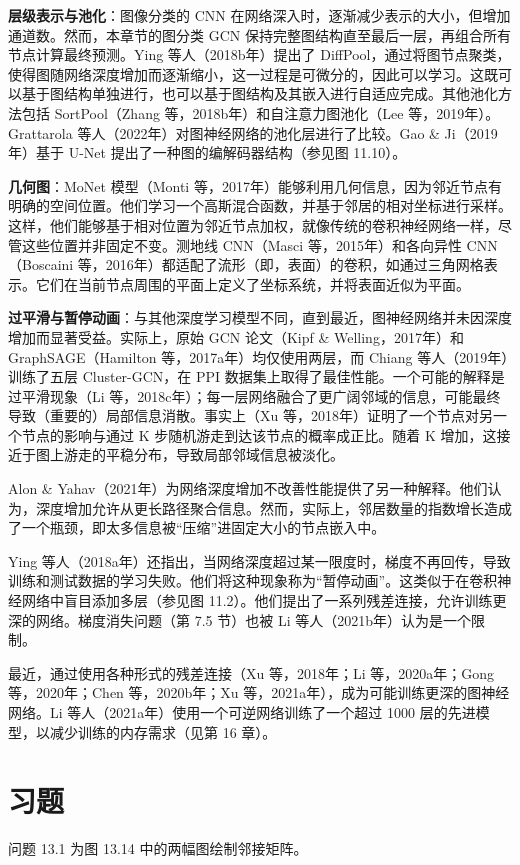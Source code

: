 \textbf{层级表示与池化}：图像分类的 CNN 在网络深入时，逐渐减少表示的大小，但增加通道数。然而，本章节的图分类 GCN 保持完整图结构直至最后一层，再组合所有节点计算最终预测。Ying 等人（2018b年）提出了 DiffPool，通过将图节点聚类，使得图随网络深度增加而逐渐缩小，这一过程是可微分的，因此可以学习。这既可以基于图结构单独进行，也可以基于图结构及其嵌入进行自适应完成。其他池化方法包括 SortPool（Zhang 等，2018b年）和自注意力图池化（Lee 等，2019年）。Grattarola 等人（2022年）对图神经网络的池化层进行了比较。Gao \& Ji（2019年）基于 U-Net 提出了一种图的编解码器结构（参见图 11.10）。

\textbf{几何图}：MoNet 模型（Monti 等，2017年）能够利用几何信息，因为邻近节点有明确的空间位置。他们学习一个高斯混合函数，并基于邻居的相对坐标进行采样。这样，他们能够基于相对位置为邻近节点加权，就像传统的卷积神经网络一样，尽管这些位置并非固定不变。测地线 CNN（Masci 等，2015年）和各向异性 CNN（Boscaini 等，2016年）都适配了流形（即，表面）的卷积，如通过三角网格表示。它们在当前节点周围的平面上定义了坐标系统，并将表面近似为平面。

\textbf{过平滑与暂停动画}：与其他深度学习模型不同，直到最近，图神经网络并未因深度增加而显著受益。实际上，原始 GCN 论文（Kipf \& Welling，2017年）和 GraphSAGE（Hamilton 等，2017a年）均仅使用两层，而 Chiang 等人（2019年）训练了五层 Cluster-GCN，在 PPI 数据集上取得了最佳性能。一个可能的解释是过平滑现象（Li 等，2018c年）；每一层网络融合了更广阔邻域的信息，可能最终导致（重要的）局部信息消散。事实上（Xu 等，2018年）证明了一个节点对另一个节点的影响与通过 K 步随机游走到达该节点的概率成正比。随着 K 增加，这接近于图上游走的平稳分布，导致局部邻域信息被淡化。

Alon \& Yahav（2021年）为网络深度增加不改善性能提供了另一种解释。他们认为，深度增加允许从更长路径聚合信息。然而，实际上，邻居数量的指数增长造成了一个瓶颈，即太多信息被“压缩”进固定大小的节点嵌入中。

Ying 等人（2018a年）还指出，当网络深度超过某一限度时，梯度不再回传，导致训练和测试数据的学习失败。他们将这种现象称为“暂停动画”。这类似于在卷积神经网络中盲目添加多层（参见图 11.2）。他们提出了一系列残差连接，允许训练更深的网络。梯度消失问题（第 7.5 节）也被 Li 等人（2021b年）认为是一个限制。

最近，通过使用各种形式的残差连接（Xu 等，2018年；Li 等，2020a年；Gong 等，2020年；Chen 等，2020b年；Xu 等，2021a年），成为可能训练更深的图神经网络。Li 等人（2021a年）使用一个可逆网络训练了一个超过 1000 层的先进模型，以减少训练的内存需求（见第 16 章）。

\section{习题}
问题 13.1 为图 13.14 中的两幅图绘制邻接矩阵。

